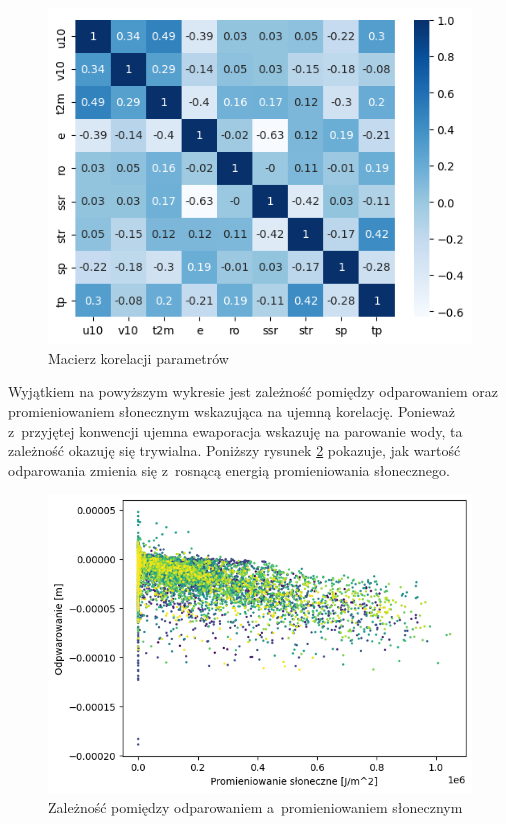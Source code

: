 \begin{figure}[H]
    \centering
    \includegraphics[width=\textwidth]{images/correlation_matrix.png}
    \caption{Macierz korelacji parametrów}
    \label{matrix}
\end{figure}

Wyjątkiem na powyższym wykresie jest zależność pomiędzy odparowaniem oraz promieniowaniem 
słonecznym wskazująca na ujemną korelację. Ponieważ z~przyjętej konwencji ujemna ewaporacja
wskazuję na parowanie wody, ta zależność okazuję się trywialna. Poniższy rysunek
\ref{e-ssr} pokazuje, jak wartość odparowania zmienia się z~rosnącą energią
promieniowania słonecznego.

\begin{figure}[H]
    \centering
    \includegraphics[width=\textwidth]{images/e-ssr.png}
    \caption{Zależność pomiędzy odparowaniem a~promieniowaniem słonecznym}
    \label{e-ssr}
\end{figure}

